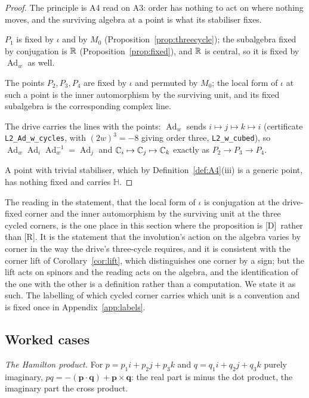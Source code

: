 \documentclass[11pt,a4paper]{article}
\theoremstyle{plain}
\theoremstyle{definition}
\theoremstyle{remark}
\newcommand{\Hquat}{\mathbb{H}}
\newcommand{\Ad}{\operatorname{Ad}}
\newcommand{\rigR}{[\textup{R}]}
\newcommand{\rigD}{[\textup{D}]}
\begin{document}
\begin{proof}
The principle is A4 read on A3: order has nothing to act on where nothing moves, and the surviving algebra at a point is what its stabiliser fixes.

$P_{1}$ is fixed by $\iota$ and by $M_{0}$ (Proposition~\ref{prop:threecycle}); the subalgebra fixed by conjugation is $\mathbb{R}$ (Proposition~\ref{prop:fixed}), and $\mathbb{R}$ is central, so it is fixed by $\Ad_{w}$ as well.

The points $P_{2},P_{3},P_{4}$ are fixed by $\iota$ and permuted by $M_{0}$; the local form of $\iota$ at such a point is the inner automorphism by the surviving unit, and its fixed subalgebra is the corresponding complex line.

The drive carries the lines with the points: $\Ad_{w}$ sends $i\mapsto j\mapsto k\mapsto i$ (certificate \texttt{L2\_Ad\_w\_cycles}, with $(2w)^{3}=-8$ giving order three, \texttt{L2\_w\_cubed}), so $\Ad_{w}\Ad_{i}\Ad_{w}^{-1}=\Ad_{j}$ and $\mathbb{C}_{i}\mapsto\mathbb{C}_{j}\mapsto\mathbb{C}_{k}$ exactly as $P_{2}\to P_{3}\to P_{4}$.

A point with trivial stabiliser, which by Definition~\ref{def:A4}(iii) is a generic point, has nothing fixed and carries $\Hquat$.
\end{proof}

The reading in the statement, that the local form of $\iota$ is conjugation at the drive-fixed corner and the inner automorphism by the surviving unit at the three cycled corners, is the one place in this section where the proposition is \rigD\ rather than \rigR. It is the statement that the involution's action on the algebra varies by corner in the way the drive's three-cycle requires, and it is consistent with the corner lift of Corollary~\ref{cor:lift}, which distinguishes one corner by a sign; but the lift acts on spinors and the reading acts on the algebra, and the identification of the one with the other is a definition rather than a computation. We state it as such. The labelling of which cycled corner carries which unit is a convention and is fixed once in Appendix~\ref{app:labels}.

\subsection{Worked cases}\label{sec:fibre-worked}

\emph{The Hamilton product.} For $p=p_{1}i+p_{2}j+p_{3}k$ and $q=q_{1}i+q_{2}j+q_{3}k$ purely imaginary, $pq=-(\mathbf p\cdot\mathbf q)+\mathbf p\times\mathbf q$: the real part is minus the dot product, the imaginary part the cross product.
\end{document}
